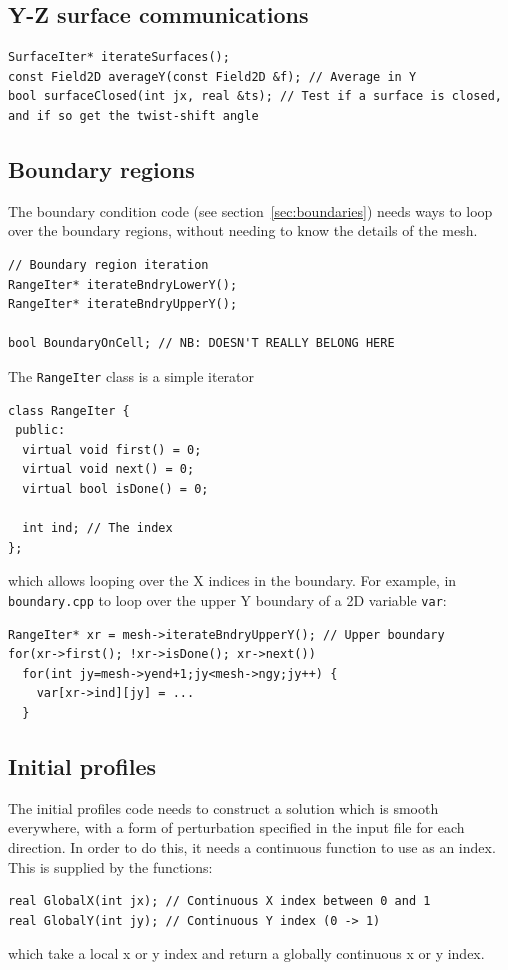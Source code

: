 \documentclass[12pt]{article}
\newcommand{\code}[1]{\texttt{#1}}
\begin{document}
\subsection{Y-Z surface communications}

\begin{lstlisting}
SurfaceIter* iterateSurfaces();
const Field2D averageY(const Field2D &f); // Average in Y
bool surfaceClosed(int jx, real &ts); // Test if a surface is closed, and if so get the twist-shift angle
\end{lstlisting}

\subsection{Boundary regions}

The boundary condition code (see section~\ref{sec:boundaries}) needs
ways to loop over the boundary regions, without needing to know
the details of the mesh.

\begin{lstlisting}
// Boundary region iteration
RangeIter* iterateBndryLowerY();
RangeIter* iterateBndryUpperY();

bool BoundaryOnCell; // NB: DOESN'T REALLY BELONG HERE
\end{lstlisting}
  
The \code{RangeIter} class is a simple iterator
\begin{lstlisting}
class RangeIter {
 public:
  virtual void first() = 0;
  virtual void next() = 0;
  virtual bool isDone() = 0;
  
  int ind; // The index
};
\end{lstlisting}
which allows looping over the X indices in the boundary. For example, in
\code{boundary.cpp} to loop over the upper Y boundary of a 2D variable
\code{var}:
\begin{lstlisting}
RangeIter* xr = mesh->iterateBndryUpperY(); // Upper boundary
for(xr->first(); !xr->isDone(); xr->next())
  for(int jy=mesh->yend+1;jy<mesh->ngy;jy++) {
    var[xr->ind][jy] = ...
  }
\end{lstlisting}

\subsection{Initial profiles}

The initial profiles code needs to construct a solution which is smooth
everywhere, with a form of perturbation specified in the input file
for each direction. In order to do this, it needs a continuous function
to use as an index. This is supplied by the functions:
\begin{lstlisting}
real GlobalX(int jx); // Continuous X index between 0 and 1
real GlobalY(int jy); // Continuous Y index (0 -> 1)
\end{lstlisting}
which take a local x or y index and return a globally continuous x or y
index.
\end{document}
